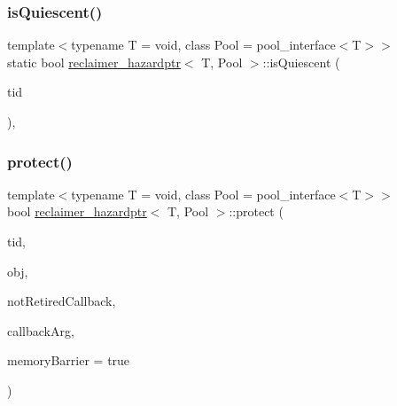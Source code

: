 \subsubsection{\texorpdfstring{is\+Quiescent()}{isQuiescent()}}
{\footnotesize\ttfamily template$<$typename T  = void, class Pool  = pool\+\_\+interface$<$\+T$>$$>$ \\
static bool \hyperlink{classreclaimer__hazardptr}{reclaimer\+\_\+hazardptr}$<$ T, Pool $>$\+::is\+Quiescent (\begin{DoxyParamCaption}\item[{const int}]{tid }\end{DoxyParamCaption})\hspace{0.3cm}{\ttfamily [inline]}, {\ttfamily [static]}}

\mbox{\label{classreclaimer__hazardptr_a847fe92a7812e847d7ab5fc49048b734}} 
\subsubsection{\texorpdfstring{protect()}{protect()}}
{\footnotesize\ttfamily template$<$typename T  = void, class Pool  = pool\+\_\+interface$<$\+T$>$$>$ \\
bool \hyperlink{classreclaimer__hazardptr}{reclaimer\+\_\+hazardptr}$<$ T, Pool $>$\+::protect (\begin{DoxyParamCaption}\item[{const int}]{tid,  }\item[{T $\ast$const}]{obj,  }\item[{\hyperlink{globals_8h_a57f5c0d40b156d7d996492fb2f16e3cd}{Callback\+Type}}]{not\+Retired\+Callback,  }\item[{\hyperlink{globals_8h_a3de64ef48066ac6430631c8b81a15345}{Callback\+Arg}}]{callback\+Arg,  }\item[{bool}]{memory\+Barrier = {\ttfamily true} }\end{DoxyParamCaption})\hspace{0.3cm}{\ttfamily [inline]}}

\mbox{\label{classreclaimer__hazardptr_aa32d2290c1950c91650cdf44397520b5}} 
